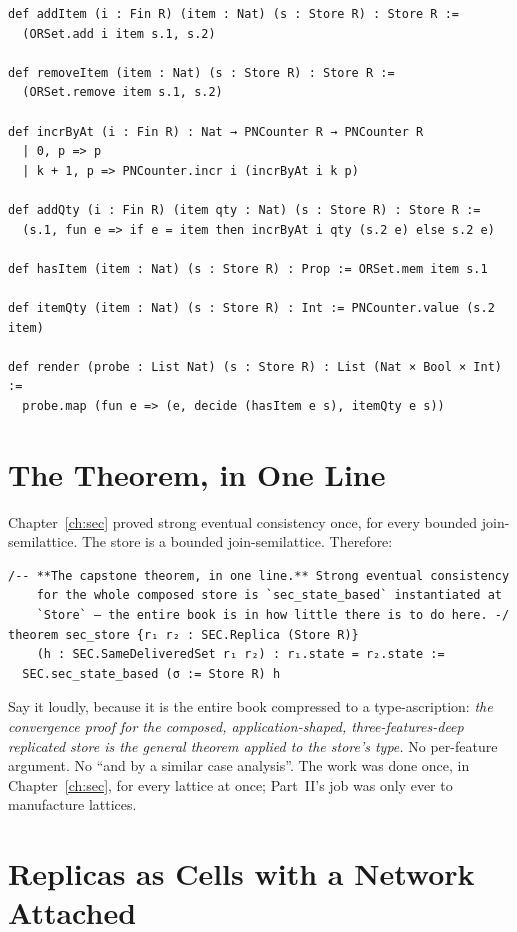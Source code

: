 \documentclass[12pt, a4paper, openright]{book}
\theoremstyle{thmstyle}
\theoremstyle{defstyle}
\begin{document}
\begin{verbatim}
def addItem (i : Fin R) (item : Nat) (s : Store R) : Store R :=
  (ORSet.add i item s.1, s.2)

def removeItem (item : Nat) (s : Store R) : Store R :=
  (ORSet.remove item s.1, s.2)

def incrByAt (i : Fin R) : Nat → PNCounter R → PNCounter R
  | 0, p => p
  | k + 1, p => PNCounter.incr i (incrByAt i k p)

def addQty (i : Fin R) (item qty : Nat) (s : Store R) : Store R :=
  (s.1, fun e => if e = item then incrByAt i qty (s.2 e) else s.2 e)

def hasItem (item : Nat) (s : Store R) : Prop := ORSet.mem item s.1

def itemQty (item : Nat) (s : Store R) : Int := PNCounter.value (s.2 item)

def render (probe : List Nat) (s : Store R) : List (Nat × Bool × Int) :=
  probe.map (fun e => (e, decide (hasItem e s), itemQty e s))
\end{verbatim}

\section{The Theorem, in One Line}

Chapter~\ref{ch:sec} proved strong eventual consistency once, for every
bounded join-semilattice. The store is a bounded join-semilattice.
Therefore:

\begin{verbatim}
/-- **The capstone theorem, in one line.** Strong eventual consistency
    for the whole composed store is `sec_state_based` instantiated at
    `Store` — the entire book is in how little there is to do here. -/
theorem sec_store {r₁ r₂ : SEC.Replica (Store R)}
    (h : SEC.SameDeliveredSet r₁ r₂) : r₁.state = r₂.state :=
  SEC.sec_state_based (σ := Store R) h
\end{verbatim}

Say it loudly, because it is the entire book compressed to a
type-ascription: \emph{the convergence proof for the composed,
application-shaped, three-features-deep replicated store is the general
theorem applied to the store's type.} No per-feature argument. No
``and by a similar case analysis''. The work was done once, in
Chapter~\ref{ch:sec}, for every lattice at once; Part~II's job was only
ever to manufacture lattices.

\section{Replicas as Cells with a Network Attached}
\end{document}
